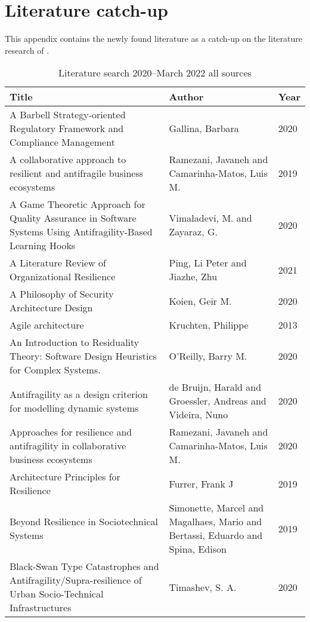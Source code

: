 \appendix
\chapter{Literature catch-up}
\label{app:literaturecatchup}
This appendix contains the newly found literature as a catch-up on the literature research of \textcite{Botjes2020}.

\begin{longtable}{p{}p{}p{}}
	\toprule%
	\textbf{Title} & \textbf{Author} & \textbf{Year} \\
	\midrule%
	\endhead%
	\hline
	\endfoot%
	\caption[Literature search 2020--March 2022 all sources]{Literature search 2020--March 2022 all sources}
	\label{tab:literatureafter2020all}
	\endlastfoot%
		A Barbell Strategy-oriented Regulatory Framework and Compliance Management & Gallina, Barbara & 2020 \\
		A collaborative approach to resilient and antifragile business ecosystems & Ramezani, Javaneh and Camarinha-Matos, Luis M. & 2019 \\
		A Game Theoretic Approach for Quality Assurance in Software Systems Using Antifragility-Based Learning Hooks & Vimaladevi, M. and Zayaraz, G. & 2020 \\
		A Literature Review of Organizational Resilience & Ping, Li Peter and Jiazhe, Zhu & 2021 \\
		A Philosophy of Security Architecture Design & Koien, Geir M. & 2020 \\
		Agile architecture & Kruchten, Philippe & 2013 \\
		An Introduction to Residuality Theory: Software Design Heuristics for Complex Systems. & O'Reilly, Barry M. & 2020 \\
		Antifragility as a design criterion for modelling dynamic systems & de Bruijn, Harald and Groessler, Andreas and Videira, Nuno & 2020 \\
		Approaches for resilience and antifragility in collaborative business ecosystems & Ramezani, Javaneh and Camarinha-Matos, Luis M. & 2020 \\
		Architecture Principles for Resilience & Furrer, Frank J & 2019 \\
		Beyond Resilience in Sociotechnical Systems & Simonette, Marcel and Magalhaes, Mario and Bertassi, Eduardo and Spina, Edison & 2019 \\
		Black-Swan Type Catastrophes and Antifragility/Supra-resilience of Urban Socio-Technical Infrastructures & Timashev, S. A. & 2020 \\

\end{longtable}
